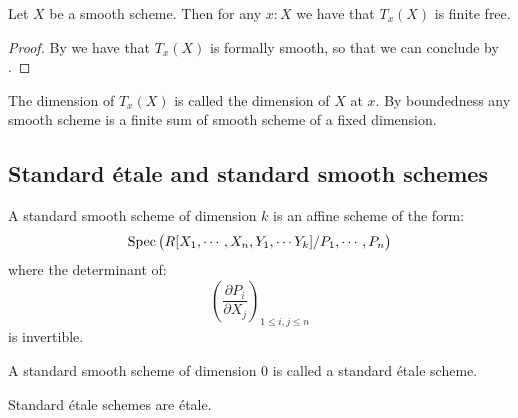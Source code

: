 \begin{proposition}\label{smooth-have-free-tangent}
Let $X$ be a smooth scheme. Then for any $x:X$ we have that $T_x(X)$ is finite free.
\end{proposition}

\begin{proof}
By  we have that $T_x(X)$ is formally smooth, so that we can conclude by .
\end{proof}

The dimension of $T_x(X)$ is called the dimension of $X$ at $x$. By boundedness any smooth scheme is a finite sum of smooth scheme of a fixed dimension.


\subsection{Standard étale and standard smooth schemes}

\begin{definition}
A standard smooth scheme of dimension $k$ is an affine scheme of the form:
\[\operatorname{Spec}\big(R[X_1,\cdots,X_n,Y_1,\cdots Y_{k}] / P_1,\cdots,P_n\big)\]
where the determinant of:
\[\left( \frac{\partial P_i}{\partial X_j}\right)_{1\leq i,j\leq n}\]
is invertible.
\end{definition}

\begin{definition}
A standard smooth scheme of dimension $0$ is called a standard étale scheme.
\end{definition}

\begin{lemma}\label{standard-etale-are-etale}
Standard étale schemes are étale.
\end{lemma}

